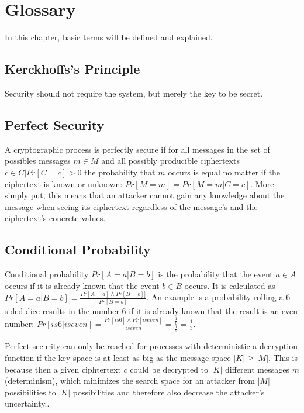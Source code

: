 \chapter{Glossary}

In this chapter, basic terms will be defined and explained.

\section{Kerckhoffs's Principle}

Security should not require the system, but merely the key to be secret.

\section{Perfect Security}

A cryptographic process is perfectly secure if for all messages in the set of possibles messages $m \in M$ and all possibly producible ciphertexts $c \in C | Pr[C=c] > 0$ the probability that $m$ occurs is equal no matter if the ciphertext is known or unknown: $Pr[M=m] = Pr[M=m | C=c]$. More simply put, this means that an attacker cannot gain any knowledge about the message when seeing its ciphertext regardless of the message's and the ciphertext's concrete values.

\section{Conditional Probability}

Conditional probability $Pr[A=a | B=b]$ is the probability that the event $a \in A$ occurs if it is already known that the event $b \in B$ occurs. It is calculated as $Pr[A=a | B=b] = \frac{Pr[A=a] \wedge Pr[B=b]]}{Pr[B=b]}$. An example is a probability rolling a 6-sided dice results in the number 6 if it is already known that the result is an even number: $Pr[is 6 | is even] = \frac{Pr[is 6] \wedge Pr[is even]}{is even} = \frac{\frac{1}{6}}{\frac{1}{2}} = \frac{1}{3}$.

Perfect security can only be reached for processes with deterministic a decryption function if the key space is at least as big as the message space $|K| \geq |M|$. This is because then a given ciphtertext $c$ could be decrypted to $|K|$ different messages $m$ (determinism), which minimizes the search space for an attacker from $|M|$ possibilities to $|K|$ possibilities and therefore also decrease the attacker's uncertainty..

